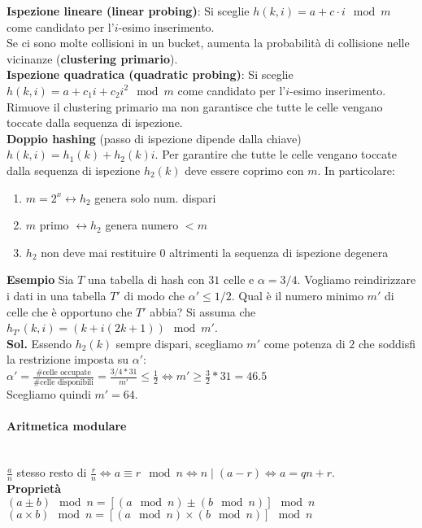 \documentclass[10pt,landscape]{article}
\newcommand{\myparagraph}[1]{\paragraph{#1}\mbox{}\\ [5pt]}
\begin{document}
\begin{multicols*}{4}
                \textbf{Ispezione lineare (linear probing)}: Si sceglie $h(k,i)=a+c\cdot i \mod m$ come candidato per l'$i$-esimo inserimento. \\
                Se ci sono molte collisioni in un bucket, aumenta la probabilità di collisione nelle vicinanze (\textbf{clustering primario}). \\ [3pt]
                \textbf{Ispezione quadratica (quadratic probing)}: Si sceglie $h(k,i)=a+c_1i+c_2i^2 \mod m$ come candidato per l'$i$-esimo inserimento. Rimuove il clustering primario ma non garantisce che tutte le celle vengano toccate dalla sequenza di ispezione. \\ [3pt]
                \textbf{Doppio hashing} (passo di ispezione dipende dalla chiave) $h(k,i)=h_1(k)+h_2(k)i$. Per garantire che tutte le celle vengano toccate dalla sequenza di ispezione $h_2(k)$ deve essere coprimo con $m$. In particolare:
                \begin{enumerate}[left=1em, itemsep=0.5pt, label=\raisebox{0.5ex}{\tiny$\bullet$}]
                        \item $m = 2^x \leftrightarrow h_2$ genera solo num. dispari
                        \item $m$ primo $\leftrightarrow h_2$ genera numero $<m$
                        \item $h_2$ non  deve mai restituire $0$ altrimenti la sequenza di ispezione degenera
                \end{enumerate}
                \textbf{Esempio}
                Sia $T$ una tabella di hash con $31$ celle e $\alpha = 3/4$. Vogliamo reindirizzare i dati in una tabella $T'$ di modo che $\alpha' \le 1/2$. Qual è il numero minimo $m'$ di celle che è opportuno che $T'$ abbia? Si assuma che $h_{T'}(k,i)=(k+i(2k+1)) \mod m'$.\\ [3pt]
                \textbf{Sol.} Essendo $h_2(k)$ sempre dispari, scegliamo $m'$ come potenza di $2$ che soddisfi la restrizione imposta su $\alpha'$: \\ [3pt]
                $\alpha'=\frac{\text{\# celle occupate}}{\text{\# celle disponibili}}=\frac{3/4*31}{m'} \le \frac{1}{2} \iff m' \ge \frac{3}{2}*31 = 46.5$ \\ [3pt]
                Scegliamo quindi $m' = 64$.
                \myparagraph{Aritmetica modulare}
        $\frac{a}{n}$ stesso resto di $\frac{r}{n} \iff a \equiv r\mod n \iff  n \mid (a-r) \iff a = qn+r$.  \\ [3pt]
                \textbf{Proprietà} \\ [3pt]
        $(a \pm b)\mod n= [(a\mod n) \pm (b\mod n)]\mod n$ \\ [3pt]
        $(a \times b)\mod n = [(a\mod n) \times (b\mod n)]\mod n$ \\

\end{multicols*}
\end{document}
